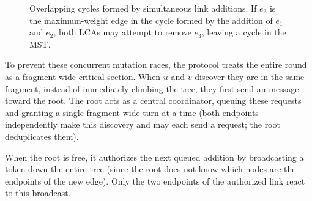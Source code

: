 \begin{figure}[htbp]
\centering
{}
\caption{Overlapping cycles formed by simultaneous link additions. If $e_3$ is the
maximum-weight edge in the cycle formed by the addition of $e_1$ and $e_2$, both LCAs may
attempt to remove $e_3$, leaving a cycle in the MST.}
\label{fig:overlapping_cycles}
\end{figure}

To prevent these concurrent mutation races, the protocol treats the entire round as a
fragment-wide critical section. When $u$ and $v$ discover they are in the same fragment,
instead of immediately climbing the tree, they first send an  message
toward the root. The root acts as a central coordinator, queuing these requests and
granting a single fragment-wide turn at a time (both endpoints independently make this
discovery and may each send a request; the root deduplicates them).

When the root is free, it authorizes the next queued addition by broadcasting a
 token down the entire tree (since the root does not know which nodes are 
the endpoints of the new edge). Only the two endpoints of the authorized link react to
this broadcast.

